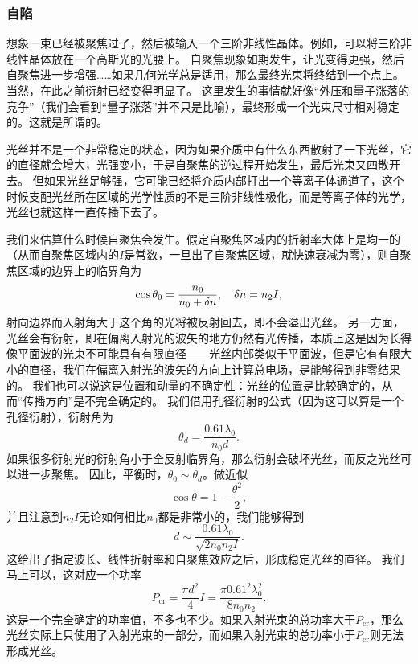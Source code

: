 \subsubsection{自陷}

想象一束已经被聚焦过了，然后被输入一个三阶非线性晶体。例如，可以将三阶非线性晶体放在一个高斯光的光腰上。
自聚焦现象如期发生，让光变得更强，然后自聚焦进一步增强……如果几何光学总是适用，那么最终光束将终结到一个点上。
当然，在此之前衍射已经变得明显了。
这里发生的事情就好像“外压和量子涨落的竞争”（我们会看到“量子涨落”并不只是比喻），最终形成一个光束尺寸相对稳定的。这就是所谓的。

光丝并不是一个非常稳定的状态，因为如果介质中有什么东西散射了一下光丝，它的直径就会增大，光强变小，于是自聚焦的逆过程开始发生，最后光束又四散开去。
但如果光丝足够强，它可能已经将介质内部打出一个等离子体通道了，这个时候支配光丝所在区域的光学性质的不是三阶非线性极化，而是等离子体的光学，光丝也就这样一直传播下去了。

我们来估算什么时候自聚焦会发生。假定自聚焦区域内的折射率大体上是均一的（从而自聚焦区域内的$I$是常数，一旦出了自聚焦区域，就快速衰减为零），则自聚焦区域的边界上的临界角为
\[
    \cos \theta_0 = \frac{n_0}{n_0 + \var{n}}, \quad \var{n} = n_2 I,
\]
射向边界而入射角大于这个角的光将被反射回去，即不会溢出光丝。
另一方面，光丝会有衍射，即在偏离入射光的波矢的地方仍然有光传播，本质上这是因为长得像平面波的光束不可能具有有限直径——光丝内部类似于平面波，但是它有有限大小的直径，我们在偏离入射光的波矢的方向上计算总电场，是能够得到非零结果的。
我们也可以说这是位置和动量的不确定性：光丝的位置是比较确定的，从而“传播方向”是不完全确定的。
我们借用孔径衍射的公式（因为这可以算是一个孔径衍射），衍射角为
\[
    \theta_d = \frac{0.61 \lambda_0}{n_0 d}.
\]
如果很多衍射光的衍射角小于全反射临界角，那么衍射会破坏光丝，而反之光丝可以进一步聚焦。
因此，平衡时，$\theta_0 \sim \theta_d$。做近似
\[
    \cos\theta = 1 - \frac{\theta^2}{2},
\]
并且注意到$n_2 I$无论如何相比$n_0$都是非常小的，我们能够得到
\begin{equation}
    d \sim \frac{0.61 \lambda_0}{\sqrt{2 n_0 n_2 I}} .
\end{equation}
这给出了指定波长、线性折射率和自聚焦效应之后，形成稳定光丝的直径。
我们马上可以，这对应一个功率
\begin{equation}
    P_\text{cr} = \frac{\pi d^2}{4} I = \frac{\pi 0.61^2 \lambda_0^2}{8 n_0 n_2}.
\end{equation}
这是一个完全确定的功率值，不多也不少。如果入射光束的总功率大于$P_\text{cr}$，那么光丝实际上只使用了入射光束的一部分，而如果入射光束的总功率小于$P_\text{cr}$则无法形成光丝。

